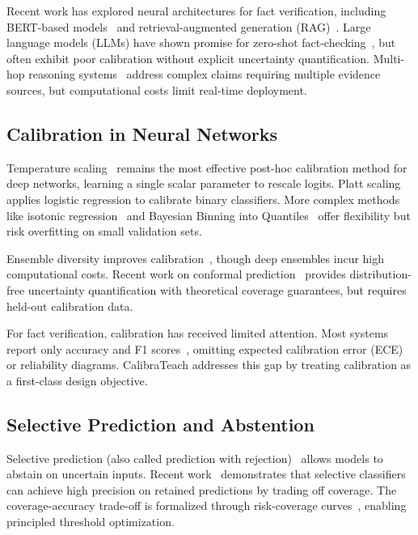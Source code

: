 \documentclass[journal]{IEEEtran}
\begin{document}
Recent work has explored neural architectures for fact verification, including BERT-based models~\cite{Devlin2019} and retrieval-augmented generation (RAG)~\cite{Lewis2020}. Large language models (LLMs) have shown promise for zero-shot fact-checking~\cite{Bang2023,OpenAI2023}, but often exhibit poor calibration without explicit uncertainty quantification. Multi-hop reasoning systems~\cite{Yang2018,Khot2020} address complex claims requiring multiple evidence sources, but computational costs limit real-time deployment.

\subsection{Calibration in Neural Networks}

Temperature scaling~\cite{Guo2017} remains the most effective post-hoc calibration method for deep networks, learning a single scalar parameter to rescale logits. Platt scaling~\cite{Platt1999} applies logistic regression to calibrate binary classifiers. More complex methods like isotonic regression~\cite{Zadrozny2002} and Bayesian Binning into Quantiles~\cite{Naeini2015} offer flexibility but risk overfitting on small validation sets.

Ensemble diversity improves calibration~\cite{Lakshminarayanan2017}, though deep ensembles incur high computational costs. Recent work on conformal prediction~\cite{Angelopoulos2021,Shafer2008} provides distribution-free uncertainty quantification with theoretical coverage guarantees, but requires held-out calibration data.

For fact verification, calibration has received limited attention. Most systems report only accuracy and F1 scores~\cite{FEVER2018,SciFact2020}, omitting expected calibration error (ECE) or reliability diagrams. CalibraTeach addresses this gap by treating calibration as a first-class design objective.

\subsection{Selective Prediction and Abstention}

Selective prediction (also called prediction with rejection)~\cite{ChowRejection1970} allows models to abstain on uncertain inputs. Recent work~\cite{Geifman2017,Geifman2019} demonstrates that selective classifiers can achieve high precision on retained predictions by trading off coverage. The coverage-accuracy trade-off is formalized through risk-coverage curves~\cite{El-Yaniv2010}, enabling principled threshold optimization.
\end{document}
